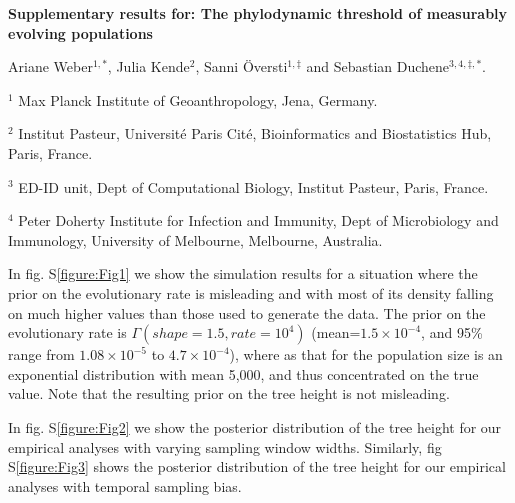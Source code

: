\documentclass[11pt]{article}
\begin{document}
\begin{flushright}

\end{flushright}
\begin{center}
	\begin{LARGE}
	\textbf{Supplementary results for: The phylodynamic threshold of measurably evolving populations}
	\end{LARGE}


Ariane Weber$^{1,*}$, Julia Kende$^{2}$, Sanni Översti$^{1, \ddagger}$ and Sebastian Duchene$^{3,4,\ddagger, *}$.
\end{center}

$^{1}$ Max Planck Institute of Geoanthropology, Jena, Germany.

$^{2}$ Institut Pasteur, Université Paris Cité, Bioinformatics and Biostatistics Hub, Paris, France.

$^{3}$ ED-ID unit, Dept of Computational Biology, Institut Pasteur, Paris, France.

$^{4}$ Peter Doherty Institute for Infection and Immunity, Dept of Microbiology and Immunology, University of Melbourne, Melbourne, Australia.
\newline

In fig. S\ref{figure:Fig1} we show the simulation results for a situation where the prior on the evolutionary rate is misleading and with most of its density falling on much higher values than those used to generate the data. The prior on the evolutionary rate is $\Gamma(shape=1.5, rate=10^{4})$ (mean=$1.5\times 10^{-4}$, and 95\% range from $1.08 \times 10^{-5}$ to $4.7 \times 10^{-4}$), where as that for the population size is an exponential distribution with mean 5,000, and thus concentrated on the true value. Note that the resulting prior on the tree height is not misleading.

In fig. S\ref{figure:Fig2} we show the posterior distribution of the tree height for our empirical analyses with varying sampling window widths. Similarly, fig S\ref{figure:Fig3} shows the posterior distribution of the tree height for our empirical analyses with temporal sampling bias.
\end{document}
